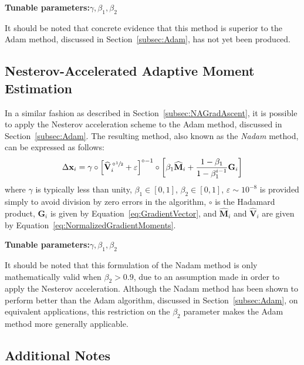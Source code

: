 \documentclass{article}
\begin{document}
\begin{center}
	\textbf{Tunable parameters:}\hspace{20pt}$\gamma,\beta_1,\beta_2$
\end{center}

It should be noted that concrete evidence that this method is superior to the Adam method, discussed in Section~\ref{subsec:Adam}, has not yet been produced.

\subsection{Nesterov-Accelerated Adaptive Moment Estimation}
\label{subsec:Nadam}

In a similar fashion as described in Section~\ref{subsec:NAGradAscent}, it is possible to apply the Nesterov acceleration scheme to the Adam method, discussed in Section~\ref{subsec:Adam}. The resulting method, also known as the \emph{Nadam} method, can be expressed as follows:
\begin{equation}
\label{eq:SE_Nadam}
	\Delta \mathbf{x}_i = \gamma \circ \left[\widehat{\mathbf{V}}_i^{\,\circ\sfrac{1}{2}} + \varepsilon\right]^{ \circ-1} \circ \left[\beta_1 \widehat{\mathbf{M}}_i + \frac{1 - \beta_1}{1 - \beta_1^{i-1}} \mathbf{G}_i\right]
\end{equation}
where $\gamma$ is typically less than unity, $\beta_1 \in \left[0,1\right]$, $\beta_2 \in \left[0,1\right]$, $\varepsilon \sim 10^{-8}$ is provided simply to avoid division by zero errors in the algorithm, $\circ$ is the Hadamard product, $\mathbf{G}_i$ is given by Equation~\eqref{eq:GradientVector}, and $\widehat{\mathbf{M}}_i$ and $\widehat{\mathbf{V}}_i$ are given by Equation~\eqref{eq:NormalizedGradientMoments}.

\begin{center}
	\textbf{Tunable parameters:}\hspace{20pt}$\gamma,\beta_1,\beta_2$
\end{center}

It should be noted that this formulation of the Nadam method is only mathematically valid when $\beta_2 > 0.9$, due to an assumption made in order to apply the Nesterov acceleration. Although the Nadam method has been shown to perform better than the Adam algorithm, discussed in Section~\ref{subsec:Adam}, on equivalent applications, this restriction on the $\beta_2$ parameter makes the Adam method more generally applicable.

\subsection{Additional Notes}
\label{subsec:Notes}
\end{document}
